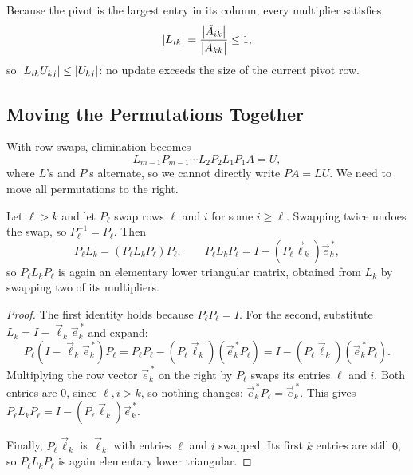 Because the pivot is the largest entry in its column, every multiplier satisfies
\begin{equation}
  \left\lvert L_{ik} \right\rvert = \frac{\left\lvert \tilde{A}_{ik} \right\rvert}{\left\lvert \tilde{A}_{kk} \right\rvert} \le 1,
\end{equation}
so $\left\lvert L_{ik}U_{kj} \right\rvert \le \left\lvert U_{kj} \right\rvert$: no update exceeds the size of the current pivot row.

\subsection{Moving the Permutations Together}

With row swaps, elimination becomes
\begin{equation}
  L_{m-1}P_{m-1} \cdots L_2P_2L_1P_1A = U,
\end{equation}
where $L$'s and $P$'s alternate, so we cannot directly write $PA = LU$. We need to move all permutations to the right.

\begin{proposition}
  \label{prop:perm-swap}
  Let $\ell > k$ and let $P_\ell$ swap rows $\ell$ and $i$ for some $i \ge \ell$. Swapping twice undoes the swap, so $P_\ell^{-1} = P_\ell$. Then
  \begin{equation}
    P_\ell L_k = (P_\ell L_kP_\ell)P_\ell, \qquad P_\ell L_kP_\ell = I - (P_\ell\vec{\ell}_k)\vec{e}_k^{\,\ast},
  \end{equation}
  so $P_\ell L_kP_\ell$ is again an elementary lower triangular matrix, obtained from $L_k$ by swapping two of its multipliers.
\end{proposition}

\begin{proof}
  The first identity holds because $P_\ell P_\ell = I$. For the second, substitute $L_k = I - \vec{\ell}_k\vec{e}_k^{\,\ast}$ and expand:
  \begin{equation}
    P_\ell(I - \vec{\ell}_k\vec{e}_k^{\,\ast})P_\ell
    = P_\ell P_\ell - (P_\ell\vec{\ell}_k)(\vec{e}_k^{\,\ast}P_\ell)
    = I - (P_\ell\vec{\ell}_k)(\vec{e}_k^{\,\ast}P_\ell).
  \end{equation}
  Multiplying the row vector $\vec{e}_k^{\,\ast}$ on the right by $P_\ell$ swaps its entries $\ell$ and $i$. Both entries are $0$, since $\ell, i > k$, so nothing changes: $\vec{e}_k^{\,\ast}P_\ell = \vec{e}_k^{\,\ast}$. This gives $P_\ell L_kP_\ell = I - (P_\ell\vec{\ell}_k)\vec{e}_k^{\,\ast}$.

  Finally, $P_\ell\vec{\ell}_k$ is $\vec{\ell}_k$ with entries $\ell$ and $i$ swapped. Its first $k$ entries are still $0$, so $P_\ell L_kP_\ell$ is again elementary lower triangular.
\end{proof}

